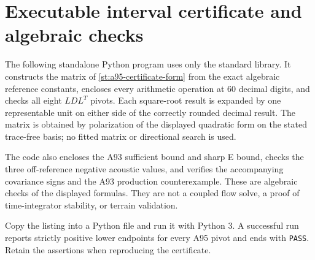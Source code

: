 \documentclass[11pt,a4paper]{article}
\numberwithin{equation}{section}
\begin{document}
\section{Executable interval certificate and algebraic checks}
\label{st:certificate}

The following standalone Python program uses only the standard
library. It constructs the matrix of
\cref{st:a95-certificate-form} from the exact algebraic reference
constants, encloses every arithmetic operation at 60 decimal digits,
and checks all eight $LDL^T$ pivots. Each square-root result is expanded
by one representable unit on either side of the correctly rounded
decimal result. The matrix is obtained by polarization of the displayed
quadratic form on the stated trace-free basis; no fitted matrix or
directional search is used.

The code also encloses the A93 sufficient bound and sharp E bound,
checks the three off-reference negative acoustic values, and verifies
the accompanying covariance signs and the A93 production
counterexample. These are algebraic checks of the displayed formulas.
They are not a coupled flow solve, a proof of time-integrator stability,
or terrain validation.

Copy the listing into a Python file and run it with Python 3. A
successful run reports strictly positive lower endpoints for every
A95 pivot and ends with \texttt{PASS}. Retain the assertions when
reproducing the certificate.
\end{document}
